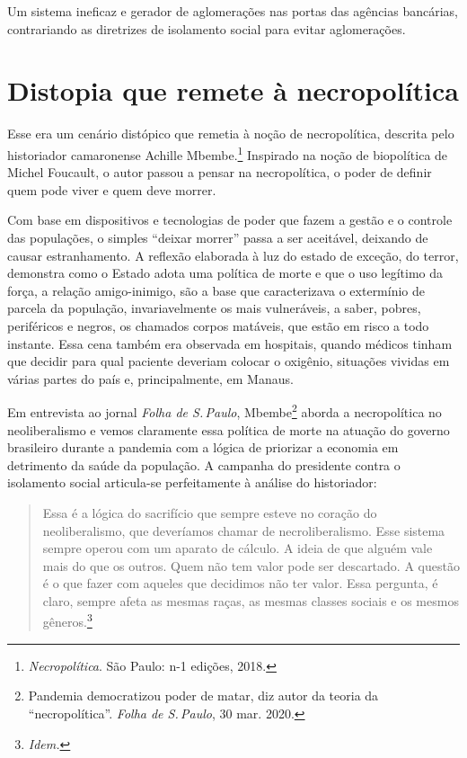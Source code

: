 Um sistema ineficaz e gerador de aglomerações nas portas das agências
bancárias, contrariando as diretrizes de isolamento social para evitar
aglomerações.

\section{Distopia que remete à necropolítica}

Esse era um cenário distópico que remetia à noção de necropolítica,
descrita pelo historiador camaronense Achille Mbembe.\footnote{\textit{Necropolítica}. São Paulo: n-1 edições, 2018.} Inspirado na
noção de biopolítica de Michel Foucault, o autor passou a pensar na
necropolítica, o poder de definir quem pode viver e quem deve morrer.

Com base em dispositivos e tecnologias de poder que fazem a gestão e o
controle das populações, o simples ``deixar morrer'' passa a ser
aceitável, deixando de causar estranhamento. A reflexão elaborada à luz
do estado de exceção, do terror, demonstra como o Estado adota uma
política de morte e que o uso legítimo da força, a relação
amigo-inimigo, são a base que caracterizava o extermínio de parcela da
população, invariavelmente os mais vulneráveis, a saber, pobres,
periféricos e negros, os chamados corpos matáveis, que estão em risco a
todo instante. Essa cena também era observada em hospitais, quando
médicos tinham que decidir para qual paciente deveriam colocar o
oxigênio, situações vividas em várias partes do país e, principalmente,
em Manaus.

Em entrevista ao jornal \textit{Folha de S.\,Paulo}, Mbembe\footnote{Pandemia democratizou poder de matar, diz autor
da teoria da ``necropolítica''. \textit{Folha de S.\,Paulo}, 30 mar. 2020.} aborda a
necropolítica no neoliberalismo e vemos claramente essa política de
morte na atuação do governo brasileiro durante a pandemia com a lógica
de priorizar a economia em detrimento da saúde da população. A campanha
do presidente contra o isolamento social articula-se perfeitamente à
análise do historiador:

\begin{quote}
Essa é a lógica do sacrifício que sempre esteve no coração do
neoliberalismo, que deveríamos chamar de necroliberalismo. Esse sistema
sempre operou com um aparato de cálculo. A ideia de que alguém vale mais
do que os outros. Quem não tem valor pode ser descartado. A questão é o
que fazer com aqueles que decidimos não ter valor. Essa pergunta, é
claro, sempre afeta as mesmas raças, as mesmas classes sociais e os
mesmos gêneros.\footnote{\textit{Idem.}}
\end{quote}

